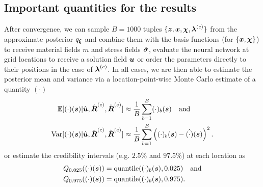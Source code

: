\subsection{Important quantities for the results}
After convergence, we can sample $B=1000$ tuples $\{ \boldsymbol{z}, \boldsymbol{x}, \boldsymbol{\chi}, \boldsymbol{\lambda}^{(c)} \}$ from the approximate posterior $q_{\boldsymbol{\xi}}$ and combine them with the basis functions (for $\{ \boldsymbol{x}, \boldsymbol{\chi} \}$) to receive material fields $m$ and stress fields $\tilde{\boldsymbol{\sigma}}$, evaluate the neural network at grid locations to receive a solution field $\boldsymbol{u}$ or order the parameters directly to their positions in the case of $\boldsymbol{\lambda}^{(c)}$. In all cases, we are then able to estimate the posterior mean and variance via a location-point-wise Monte Carlo estimate of a quantity $(\cdot)$
\begin{align}
    \label{eqn:mean}
    \mathbb{E}[(\cdot)(\boldsymbol{s}) | \hat{\boldsymbol{u}}, \hat{\boldsymbol{R}}^{(c)}, \hat{\boldsymbol{R}}^{(e)}] &\approx \frac{1}{B} \sum_{b=1}^B (\cdot)_{b}(\boldsymbol{s}) \quad \mathrm{and} \\
    \mathrm{Var}[ (\cdot)(\boldsymbol{s}) | \hat{\boldsymbol{u}}, \hat{\boldsymbol{R}}^{(c)}, \hat{\boldsymbol{R}}^{(e)} ] &\approx \frac{1}{B } \sum_{b=1}^B \left( (\cdot)_{b}(\boldsymbol{s}) - \hat{(\cdot)}(\boldsymbol{s}) \right)^2. \label{eqn:variance}
\end{align}
or estimate the credibility intervals (e.g. $2.5 \%$ and $97.5 \%$) at each location as
\begin{align}
   Q_{0.025} ((\cdot)(\ve s)) %
   &= \mathrm{quantile}((\cdot)_b(\ve s), 0.025) \quad \mathrm{and} \label{eqn:lower_bound}\\
    Q_{0.975} ((\cdot)(\ve s)) %
    &= \mathrm{quantile}((\cdot)_b(\ve s), 0.975).  \label{eqn:upper_bound}
\end{align}